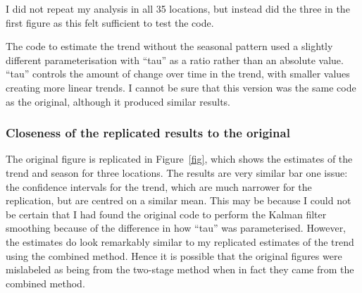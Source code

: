 I did not repeat my analysis in all 35 locations, but instead did the three in the first figure as this felt sufficient to test the code.

The code to estimate the trend without the seasonal pattern used a slightly different parameterisation with ``tau'' as a ratio rather than an absolute value. ``tau'' controls the amount of change over time in the trend, with smaller values creating more linear trends. I cannot be sure that this version was the same code as the original, although it produced similar results.


\subsubsection{Closeness of the replicated results to the original}

The original figure is replicated in Figure~\ref{fig}, which shows the estimates of the trend and season for three locations.
The results are very similar bar one issue: the confidence intervals for the trend, which are much narrower for the replication, but are centred on a similar mean.
This may be because I could not be certain that I had found the original code to perform the Kalman filter smoothing because of the difference in how ``tau'' was parameterised. However, the estimates do look remarkably similar to my replicated estimates of the trend using the combined method. Hence it is possible that the original figures were mislabeled as being from the two-stage method when in fact they came from the combined method.

